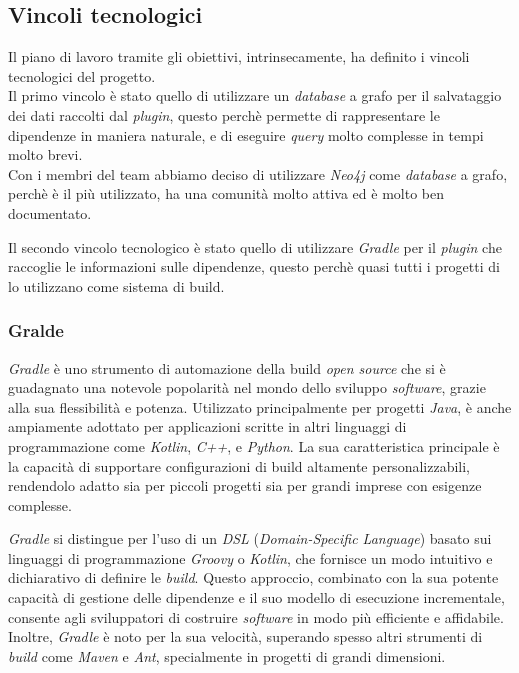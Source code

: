   \subsection*{ Vincoli tecnologici}

  Il piano di lavoro tramite gli obiettivi, intrinsecamente, ha definito i vincoli tecnologici del progetto.\\
  Il primo vincolo è stato quello di utilizzare un \textit{database} a grafo per il salvataggio dei dati raccolti dal \textit{plugin},
  questo perchè permette di rappresentare le dipendenze in maniera naturale, e di eseguire \textit{query} molto complesse in tempi molto brevi.\\
  Con i membri del team abbiamo deciso di utilizzare \textit{Neo4j} come \textit{database} a grafo, perchè è il più utilizzato, ha una comunità molto attiva
ed è molto ben documentato.

Il secondo vincolo tecnologico è stato quello di utilizzare \textit{Gradle} per il \textit{plugin} che raccoglie le informazioni sulle dipendenze,
questo perchè quasi tutti i progetti di {\azienda} lo utilizzano come sistema di build.\\

\subsubsection*{Gralde}
  \textit{Gradle} è uno strumento di automazione della build \textit{open source} che si è guadagnato una notevole popolarità nel mondo 
dello sviluppo \textit{software}, grazie alla sua flessibilità e potenza. Utilizzato principalmente per progetti \textit{Java}, 
è anche ampiamente adottato per applicazioni scritte in altri linguaggi di programmazione come \textit{Kotlin}, \textit{C++}, e \textit{Python}. 
La sua caratteristica principale è la capacità di supportare configurazioni di build altamente personalizzabili, 
rendendolo adatto sia per piccoli progetti sia per grandi imprese con esigenze complesse.

\textit{Gradle} si distingue per l'uso di un \textit{DSL} (\textit{Domain-Specific Language}) basato sui linguaggi di programmazione \textit{Groovy} o \textit{Kotlin},
 che fornisce un modo intuitivo e dichiarativo di definire le \textit{build}. Questo approccio, combinato con la sua potente capacità di 
 gestione delle dipendenze e il suo modello di esecuzione incrementale, consente agli sviluppatori di costruire \textit{software} in modo più 
 efficiente e affidabile. Inoltre, \textit{Gradle} è noto per la sua velocità, superando spesso altri strumenti di \textit{build} come \textit{Maven} 
 e \textit{Ant}, specialmente in progetti di grandi dimensioni.

